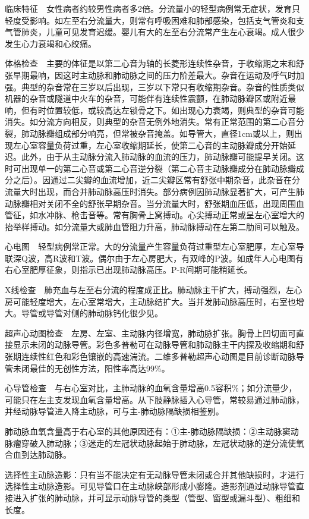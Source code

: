 临床特征　女性病者约较男性病者多2倍。分流量小的轻型病例常无症状，发育只轻度受影响。如左至右分流量大，则常有呼吸困难和肺部感染，包括支气管炎和支气管肺炎，儿童可见发育迟缓。婴儿有大的左至右分流常产生左心衰竭。成人很少发生心力衰竭和心绞痛。

体格检查　主要的体征是以第二心音为轴的长菱形连续性杂音，于收缩期之末和舒张早期最响，因这时主动脉和肺动脉之间的压力阶差最大。杂音在运动及呼气时加强。典型的杂音常在三岁以后出现，三岁以下常只有收缩期杂音。杂音的性质类似机器的杂音或隧道中火车的杂音，可能伴有连续性震颤，在肺动脉瓣区或附近最响，但有时位置较低，或较高达左锁骨之下。如出现心力衰竭，则典型的杂音可能消失。如分流方向相反，则典型的杂音无例外地消失。常有正常范围的第二心音分裂，肺动脉瓣组成部分响亮，但常被杂音掩盖。如导管大，直径1cm或以上，则出现左心室容量负荷过重，左心室收缩期延长，使第二心音的主动脉瓣成分开始延迟。此外，由于从主动脉分流入肺动脉的血流的压力，肺动脉瓣可能提早关闭。这时可出现单一的第二心音或第二心音逆分裂（第二心音主动脉瓣成分在肺动脉瓣成分之后）。因通过二尖瓣的血流增加，近二尖瓣区常有舒张中期杂音，此杂音在分流量大时出现，而合并肺动脉高压时消失。部分病例因肺动脉显著扩大，可产生肺动脉瓣相对关闭不全的舒张早期杂音。当分流量大时，舒张期血压低，出现周围血管征，如水冲脉、枪击音等。常有胸骨上窝搏动。心尖搏动正常或呈左心室增大的抬举样搏动。如分流量大或肺血管阻力升高，肺动脉搏动在左第二肋间可以触及。

心电图　轻型病例常正常。大的分流量产生容量负荷过重型左心室肥厚，左心室导联深Q波，高R波和T波。偶尔由于左心房肥大，有双峰的P波。如成年人心电图有右心室肥厚征象，则指示已出现肺动脉高压。P-R间期可能稍延长。

X线检查　肺充血与左至右分流的程度成正比。肺动脉主干扩大，搏动强烈，左心房可能轻度增大，左心室常增大，主动脉结扩大。当并发肺动脉高压时，右室也增大。导管或导管对侧的肺动脉钙化很少见。

超声心动图检查　左房、左室、主动脉内径增宽，肺动脉扩张。胸骨上凹切面可直接显示未闭的动脉导管。彩色多普勒可在动脉导管和肺动脉主干内探及收缩期和舒张期连续性红色和彩色镶嵌的高速湍流。二维多普勒超声心动图是目前诊断动脉导管未闭最佳的无创性方法，阳性率高达99\%。

心导管检查　与右心室对比，主肺动脉的血氧含量增高0.5容积\%；如分流量少，可能只在左主支发现血氧含量增高。从下肢静脉插入心导管，常较易通过肺动脉，并经动脉导管进入降主动脉，可与主-肺动脉隔缺损相鉴别。

肺动脉血氧含量高于右心室的其他原因还有：①主-肺动脉隔缺损：②主动脉窦动脉瘤穿破入肺动脉；③迷走的左冠状动脉起始于肺动脉，左冠状动脉的逆分流使氧合血到达肺动脉。

选择性主动脉造影：只有当不能决定有无动脉导管未闭或合并其他缺损时，才进行选择性主动脉造影。可见导管口在主动脉峡部形成小膨隆。造影剂通过动脉导管直接进入扩张的肺动脉，并可显示动脉导管的类型（管型、窗型或漏斗型）、粗细和长度。

